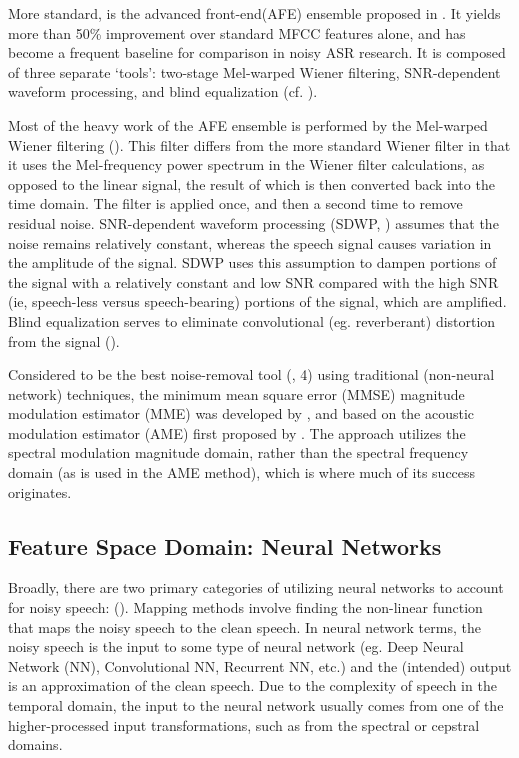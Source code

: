 More standard, is the \DIFdelbegin {}\DIFdelend \DIFaddbegin {}\DIFaddend advanced front-end\DIFdelbegin {}\DIFdelend \DIFaddbegin {}\DIFaddend (AFE) ensemble proposed in \cite{etsi:02}.  It yields more than 50\% improvement over standard MFCC features alone, and has become a frequent baseline for comparison in noisy ASR research.  It is composed of three separate `tools': two-stage Mel-warped Wiener filtering, SNR-dependent waveform processing, and blind equalization (cf. \cite{agarwal:99,macho:02,macho:01,mauuary:98}).

Most of the heavy work of the AFE ensemble is performed by the Mel-warped Wiener filtering (\cite{agarwal:99,li:14}).  This filter differs from the more standard Wiener filter in that it uses the Mel-frequency power spectrum in the Wiener filter calculations, as opposed to the linear signal, the result of which is then converted back into the time domain.  The filter is applied once, and then a second time to remove residual noise.  SNR-dependent waveform processing (SDWP, \cite{macho:01}) assumes that the noise remains relatively constant, whereas the speech signal causes variation in the amplitude of the signal.  SDWP uses this assumption to dampen portions of the signal with a relatively constant and low SNR compared with the high SNR (ie, speech-less versus speech-bearing) portions of the signal, which are amplified.  Blind equalization serves to eliminate convolutional (eg. reverberant) distortion from the signal (\cite{mauuary:98}).

Considered to be the best \DIFdelbegin {}\DIFdelend \DIFaddbegin {}\DIFaddend noise-removal tool (\cite{zhang:17}, 4) using traditional (non-neural network) techniques, the minimum mean square error (MMSE) magnitude modulation estimator (MME) was developed by \cite{paliwal:12}, and based on the acoustic modulation estimator (AME) first proposed by \cite{ephraim:84}.  The approach utilizes the spectral modulation magnitude domain, rather than the spectral frequency domain (as is used in the AME method), which is where much of its success originates.

\subsection{Feature Space Domain: Neural Networks}

Broadly, there are two primary categories of utilizing neural networks to account for noisy speech: \DIFdelbegin {}\DIFdelend \DIFaddbegin {}\DIFaddend (\cite{zhang:17}).  Mapping methods involve finding the non-linear function that maps the noisy speech to the clean speech.  In neural network terms, the noisy speech is the input to some type of neural network (eg. Deep Neural Network (NN), Convolutional NN, Recurrent NN, etc.) and the (intended) output is an approximation of the clean speech.  Due to the complexity of speech in the temporal domain, the input to the neural network usually comes from one of the higher-processed input transformations, such as from the spectral or cepstral domains.

